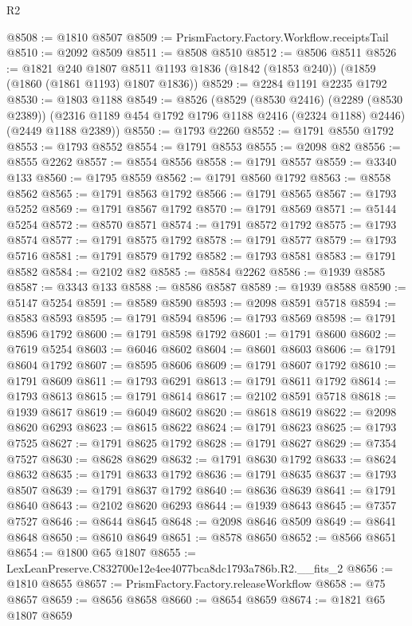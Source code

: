 \begin{lexlean}{R2}
\begin{coremodule}
@8508 := @1810 @8507
@8509 := PrismFactory.Factory.Workflow.receiptsTail
@8510 := @2092 @8509
@8511 := @8508 @8510
@8512 := @8506 @8511
@8526 := @1821
    @240
    @1807
    @8511
    @1193
    @1836
    (@1842 (@1853 @240))
    (@1859 (@1860 (@1861 @1193) @1807 @1836))
@8529 := @2284 @1191 @2235 @1792
@8530 := @1803 @1188
@8549 := @8526
    (@8529
      (@8530 @2416)
      (@2289 (@8530 @2389))
      (@2316 @1189 @454 @1792 @1796 @1188 @2416 (@2324 @1188) @2446)
      (@2449 @1188 @2389))
@8550 := @1793 @2260
@8552 := @1791 @8550 @1792
@8553 := @1793 @8552
@8554 := @1791 @8553
@8555 := @2098 @82
@8556 := @8555 @2262
@8557 := @8554 @8556
@8558 := @1791 @8557
@8559 := @3340 @133
@8560 := @1795 @8559
@8562 := @1791 @8560 @1792
@8563 := @8558 @8562
@8565 := @1791 @8563 @1792
@8566 := @1791 @8565
@8567 := @1793 @5252
@8569 := @1791 @8567 @1792
@8570 := @1791 @8569
@8571 := @5144 @5254
@8572 := @8570 @8571
@8574 := @1791 @8572 @1792
@8575 := @1793 @8574
@8577 := @1791 @8575 @1792
@8578 := @1791 @8577
@8579 := @1793 @5716
@8581 := @1791 @8579 @1792
@8582 := @1793 @8581
@8583 := @1791 @8582
@8584 := @2102 @82
@8585 := @8584 @2262
@8586 := @1939 @8585
@8587 := @3343 @133
@8588 := @8586 @8587
@8589 := @1939 @8588
@8590 := @5147 @5254
@8591 := @8589 @8590
@8593 := @2098 @8591 @5718
@8594 := @8583 @8593
@8595 := @1791 @8594
@8596 := @1793 @8569
@8598 := @1791 @8596 @1792
@8600 := @1791 @8598 @1792
@8601 := @1791 @8600
@8602 := @7619 @5254
@8603 := @6046 @8602
@8604 := @8601 @8603
@8606 := @1791 @8604 @1792
@8607 := @8595 @8606
@8609 := @1791 @8607 @1792
@8610 := @1791 @8609
@8611 := @1793 @6291
@8613 := @1791 @8611 @1792
@8614 := @1793 @8613
@8615 := @1791 @8614
@8617 := @2102 @8591 @5718
@8618 := @1939 @8617
@8619 := @6049 @8602
@8620 := @8618 @8619
@8622 := @2098 @8620 @6293
@8623 := @8615 @8622
@8624 := @1791 @8623
@8625 := @1793 @7525
@8627 := @1791 @8625 @1792
@8628 := @1791 @8627
@8629 := @7354 @7527
@8630 := @8628 @8629
@8632 := @1791 @8630 @1792
@8633 := @8624 @8632
@8635 := @1791 @8633 @1792
@8636 := @1791 @8635
@8637 := @1793 @8507
@8639 := @1791 @8637 @1792
@8640 := @8636 @8639
@8641 := @1791 @8640
@8643 := @2102 @8620 @6293
@8644 := @1939 @8643
@8645 := @7357 @7527
@8646 := @8644 @8645
@8648 := @2098 @8646 @8509
@8649 := @8641 @8648
@8650 := @8610 @8649
@8651 := @8578 @8650
@8652 := @8566 @8651
@8654 := @1800 @65 @1807
@8655 := LexLeanPreserve.C832700e12e4ee4077bca8dc1793a786b.R2.__fits_2
@8656 := @1810 @8655
@8657 := PrismFactory.Factory.releaseWorkflow
@8658 := @75 @8657
@8659 := @8656 @8658
@8660 := @8654 @8659
@8674 := @1821
    @65
    @1807
    @8659

\end{coremodule}
\end{lexlean}
